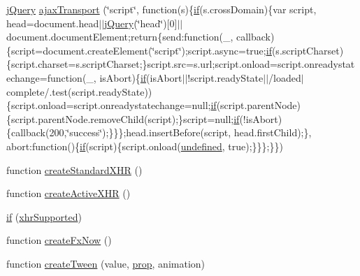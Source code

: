 \begin{DoxyCompactItemize}
\item 
\hyperlink{jquery-1_810_82_8js_a5e01048fbd3a30b44e8d491d8945c457}{j\-Query} \hyperlink{jquery-1_810_82_8js_aa4b3cc72f61c03cca7a223e4c552f80f}{ajax\-Transport} (\char`\"{}script\char`\"{}, function(s)\{\hyperlink{jquery-1_810_82_8js_aa2cebb51f03a2e3ab2af45a3f9241c96}{if}(s.\-cross\-Domain)\{var script, head=document.\-head$\vert$$\vert$\hyperlink{jquery-1_810_82_8js_a5e01048fbd3a30b44e8d491d8945c457}{j\-Query}(\char`\"{}head\char`\"{})\mbox{[}0\mbox{]}$\vert$$\vert$document.\-document\-Element;return\{send\-:function(\-\_\-, callback)\{script=document.\-create\-Element(\char`\"{}script\char`\"{});script.\-async=true;\hyperlink{jquery-1_810_82_8js_aa2cebb51f03a2e3ab2af45a3f9241c96}{if}(s.\-script\-Charset)\{script.\-charset=s.\-script\-Charset;\}script.\-src=s.\-url;script.\-onload=script.\-onreadystatechange=function(\-\_\-, is\-Abort)\{\hyperlink{jquery-1_810_82_8js_aa2cebb51f03a2e3ab2af45a3f9241c96}{if}(is\-Abort$\vert$$\vert$!script.\-ready\-State$\vert$$\vert$/loaded$\vert$complete/.test(script.\-ready\-State))\{script.\-onload=script.\-onreadystatechange=null;\hyperlink{jquery-1_810_82_8js_aa2cebb51f03a2e3ab2af45a3f9241c96}{if}(script.\-parent\-Node)\{script.\-parent\-Node.\-remove\-Child(script);\}script=null;\hyperlink{jquery-1_810_82_8js_aa2cebb51f03a2e3ab2af45a3f9241c96}{if}(!is\-Abort)\{callback(200,\char`\"{}success\char`\"{});\}\}\};head.\-insert\-Before(script, head.\-first\-Child);\}, abort\-:function()\{\hyperlink{jquery-1_810_82_8js_aa2cebb51f03a2e3ab2af45a3f9241c96}{if}(script)\{script.\-onload(\hyperlink{jquery-1_810_82_8js_a08113a236cc18d2a9d5ce27e638012be}{undefined}, true);\}\}\};\}\})
\item 
function \hyperlink{jquery-1_810_82_8js_acea019a8b67e4d114deb75d1e0b3474a}{create\-Standard\-X\-H\-R} ()
\item 
function \hyperlink{jquery-1_810_82_8js_a54bf63f1b5f905292db45a1d6a9dc300}{create\-Active\-X\-H\-R} ()
\item 
\hyperlink{jquery-1_810_82_8js_ae2dd433d7bb020adf83db5351a0671e1}{if} (\hyperlink{jquery-1_810_82_8js_afd7e72f2f357a5a8b17e46776a6283eb}{xhr\-Supported})
\item 
function \hyperlink{jquery-1_810_82_8js_a3c7bcef859b0811abb1dbf890c6cc635}{create\-Fx\-Now} ()
\item 
function \hyperlink{jquery-1_810_82_8js_a0c2043fcd2fa684768877127fbbc2e55}{create\-Tween} (value, \hyperlink{jquery-1_810_82-vsdoc_8js_af17be84954030af6c2286f5da385d41b}{prop}, animation)
\item 

\end{DoxyCompactItemize}
